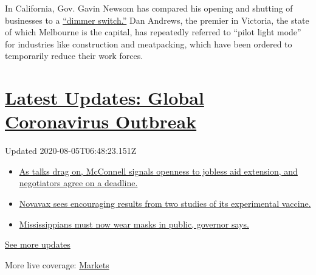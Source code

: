 In California, Gov. Gavin Newsom has compared his opening and shutting
of businesses to a
\href{https://www.nytimes.com/2020/06/30/us/coronavirus-california-cases-rising.html}{``dimmer
switch.''} Dan Andrews, the premier in Victoria, the state of which
Melbourne is the capital, has repeatedly referred to ``pilot light
mode'' for industries like construction and meatpacking, which have been
ordered to temporarily reduce their work forces.

\hypertarget{latest-updates-global-coronavirus-outbreak}{%
\section{\texorpdfstring{\href{https://www.nytimes.com/2020/08/04/world/coronavirus-cases.html?action=click\&pgtype=Article\&state=default\&region=MAIN_CONTENT_1\&context=storylines_live_updates}{Latest
Updates: Global Coronavirus
Outbreak}}{Latest Updates: Global Coronavirus Outbreak}}\label{latest-updates-global-coronavirus-outbreak}}

Updated 2020-08-05T06:48:23.151Z

\begin{itemize}
\tightlist
\item
  \href{https://www.nytimes.com/2020/08/04/world/coronavirus-cases.html?action=click\&pgtype=Article\&state=default\&region=MAIN_CONTENT_1\&context=storylines_live_updates\#link-762df92}{As
  talks drag on, McConnell signals openness to jobless aid extension,
  and negotiators agree on a deadline.}
\item
  \href{https://www.nytimes.com/2020/08/04/world/coronavirus-cases.html?action=click\&pgtype=Article\&state=default\&region=MAIN_CONTENT_1\&context=storylines_live_updates\#link-1228a480}{Novavax
  sees encouraging results from two studies of its experimental
  vaccine.}
\item
  \href{https://www.nytimes.com/2020/08/04/world/coronavirus-cases.html?action=click\&pgtype=Article\&state=default\&region=MAIN_CONTENT_1\&context=storylines_live_updates\#link-794484ed}{Mississippians
  must now wear masks in public, governor says.}
\end{itemize}

\href{https://www.nytimes.com/2020/08/04/world/coronavirus-cases.html?action=click\&pgtype=Article\&state=default\&region=MAIN_CONTENT_1\&context=storylines_live_updates}{See
more updates}

More live coverage:
\href{https://www.nytimes.com/live/2020/08/04/business/stock-market-today-coronavirus?action=click\&pgtype=Article\&state=default\&region=MAIN_CONTENT_1\&context=storylines_live_updates}{Markets}

